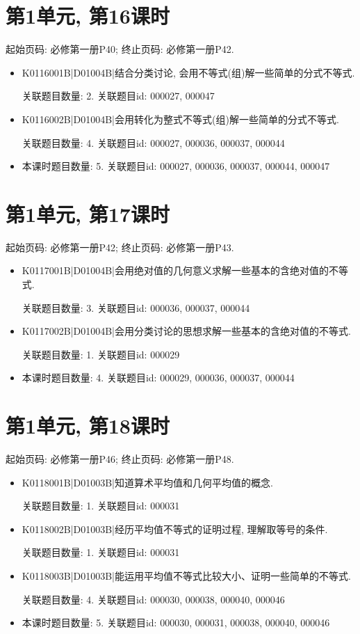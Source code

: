\section*{第1单元, 第16课时}
起始页码: 必修第一册P40; 终止页码: 必修第一册P42.
\begin{itemize}
\item K0116001B|D01004B|结合分类讨论, 会用不等式(组)解一些简单的分式不等式.

关联题目数量: 2. 关联题目id: 000027, 000047

\item K0116002B|D01004B|会用转化为整式不等式(组)解一些简单的分式不等式.

关联题目数量: 4. 关联题目id: 000027, 000036, 000037, 000044

\item 本课时题目数量: 5. 关联题目id: 000027, 000036, 000037, 000044, 000047

\end{itemize}

\section*{第1单元, 第17课时}
起始页码: 必修第一册P42; 终止页码: 必修第一册P43.
\begin{itemize}
\item K0117001B|D01004B|会用绝对值的几何意义求解一些基本的含绝对值的不等式.

关联题目数量: 3. 关联题目id: 000036, 000037, 000044

\item K0117002B|D01004B|会用分类讨论的思想求解一些基本的含绝对值的不等式.

关联题目数量: 1. 关联题目id: 000029

\item 本课时题目数量: 4. 关联题目id: 000029, 000036, 000037, 000044

\end{itemize}

\section*{第1单元, 第18课时}
起始页码: 必修第一册P46; 终止页码: 必修第一册P48.
\begin{itemize}
\item K0118001B|D01003B|知道算术平均值和几何平均值的概念.

关联题目数量: 1. 关联题目id: 000031

\item K0118002B|D01003B|经历平均值不等式的证明过程, 理解取等号的条件.

关联题目数量: 1. 关联题目id: 000031

\item K0118003B|D01003B|能运用平均值不等式比较大小、证明一些简单的不等式.

关联题目数量: 4. 关联题目id: 000030, 000038, 000040, 000046

\item 本课时题目数量: 5. 关联题目id: 000030, 000031, 000038, 000040, 000046

\end{itemize}


